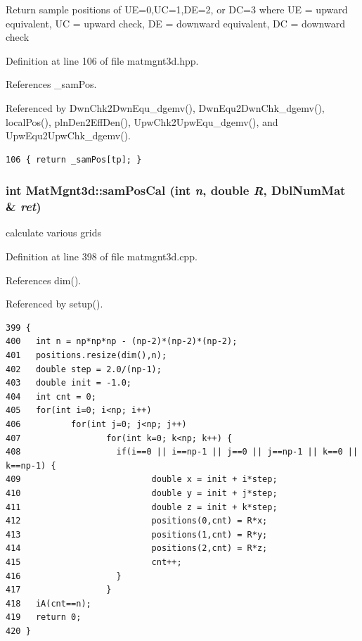 Return sample positions of UE=0,UC=1,DE=2, or DC=3 where UE = upward equivalent, UC = upward check, DE = downward equivalent, DC = downward check 

Definition at line 106 of file matmgnt3d.hpp.

References \_\-sam\-Pos.

Referenced by Dwn\-Chk2Dwn\-Equ\_\-dgemv(), Dwn\-Equ2Dwn\-Chk\_\-dgemv(), local\-Pos(), pln\-Den2Eff\-Den(), Upw\-Chk2Upw\-Equ\_\-dgemv(), and Upw\-Equ2Upw\-Chk\_\-dgemv().

\footnotesize\begin{verbatim}106 { return _samPos[tp]; }
\end{verbatim}\normalsize 


\subsubsection{\setlength{\rightskip}{0pt plus 5cm}int Mat\-Mgnt3d::sam\-Pos\-Cal (int {\em n}, double {\em R}, Dbl\-Num\-Mat \& {\em ret})}\label{classMatMgnt3d_632bf1ef6adf396e012a69cc9d71a202_632bf1ef6adf396e012a69cc9d71a202}


calculate various grids 

Definition at line 398 of file matmgnt3d.cpp.

References dim().

Referenced by setup().

\footnotesize\begin{verbatim}399 {
400   int n = np*np*np - (np-2)*(np-2)*(np-2);
401   positions.resize(dim(),n);
402   double step = 2.0/(np-1);
403   double init = -1.0;
404   int cnt = 0;
405   for(int i=0; i<np; i++)
406          for(int j=0; j<np; j++)
407                 for(int k=0; k<np; k++) {
408                   if(i==0 || i==np-1 || j==0 || j==np-1 || k==0 || k==np-1) {
409                          double x = init + i*step;
410                          double y = init + j*step;
411                          double z = init + k*step;
412                          positions(0,cnt) = R*x;
413                          positions(1,cnt) = R*y;
414                          positions(2,cnt) = R*z;
415                          cnt++;
416                   }
417                 }
418   iA(cnt==n);
419   return 0;
420 }
\end{verbatim}\normalsize 



